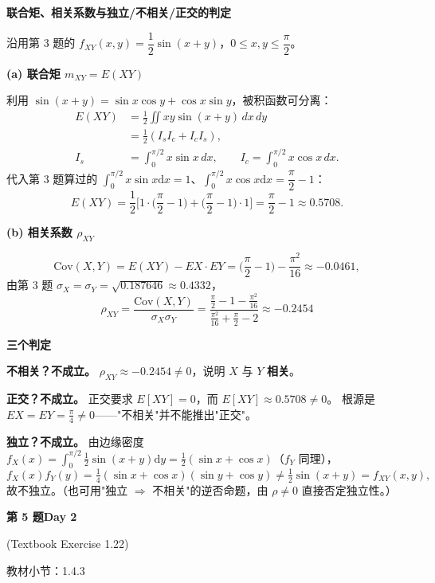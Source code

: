 \documentclass[10.5pt,fontset=fandol]{ctexart}
\newcommand{\key}[1]{\par\vspace{4pt}\noindent\textbf{\color{navy}#1}\par\vspace{2pt}}
\newcommand{\dd}{\mathrm d}\newcommand{\Var}{\operatorname{Var}}\newcommand{\Cov}{\operatorname{Cov}}
\newcommand{\qtitle}[2]{\par\addvspace{1.2em}\Needspace{8\baselineskip}\begin{tcolorbox}[colback=navy,colframe=navy,arc=1.5pt,boxrule=0pt]\color{white}\large\bfseries #1\hfill\small #2\end{tcolorbox}}
\begin{document}
\noindent\textbf{联合矩、相关系数与独立/不相关/正交的判定}\par\smallskip\begin{tcolorbox}[breakable,colback=qbg,colframe=qbg,boxrule=0pt]沿用第 3 题的 $f_{XY}(x,y)=\dfrac12\sin(x+y)$，$0\le x,y\le\dfrac{\pi}{2}$。

\key{(a) 联合矩 $m_{XY}=E(XY)$}
利用 $\sin(x+y)=\sin x\cos y+\cos x\sin y$，被积函数可分离：
\[\begin{aligned}
E(XY)&=\frac12\iint xy\sin(x+y)\,dx\,dy\\
&=\frac12(I_sI_c+I_cI_s),\\
I_s&=\int_0^{\pi/2}x\sin x\,dx,\qquad
I_c=\int_0^{\pi/2}x\cos x\,dx.
\end{aligned}\]
代入第 3 题算过的 $\int_0^{\pi/2}x\sin x\dd x=1$、$\int_0^{\pi/2}x\cos x\dd x=\dfrac{\pi}{2}-1$：
\[
E(XY)=\frac12\Big[1\cdot\Big(\frac{\pi}{2}-1\Big)+\Big(\frac{\pi}{2}-1\Big)\cdot1\Big]
=\frac{\pi}{2}-1\approx0.5708 .
\]

\key{(b) 相关系数 $\rho_{XY}$}
\[
\mathrm{Cov}(X,Y)=E(XY)-EX\cdot EY=\Big(\frac{\pi}{2}-1\Big)-\frac{\pi^2}{16}\approx-0.0461,
\]
由第 3 题 $\sigma_X=\sigma_Y=\sqrt{0.187646}\approx0.4332$，
\[
\boxed{\rho_{XY}=\frac{\mathrm{Cov}(X,Y)}{\sigma_X\sigma_Y}
=\frac{\frac{\pi}{2}-1-\frac{\pi^2}{16}}{\frac{\pi^2}{16}+\frac{\pi}{2}-2}\approx-0.2454}
\]

\key{三个判定}
\begin{bul}
  \item \textbf{不相关？不成立。} $\rho_{XY}\approx-0.2454\neq0$，说明 $X$ 与 $Y$ \textbf{相关}。
  \item \textbf{正交？不成立。} 正交要求 $E[XY]=0$，而 $E[XY]\approx0.5708\neq0$。
        根源是 $EX=EY=\tfrac{\pi}{4}\neq0$——"不相关"并不能推出"正交"。
  \item \textbf{独立？不成立。} 由边缘密度
        $f_X(x)=\int_0^{\pi/2}\tfrac12\sin(x+y)\dd y=\tfrac12(\sin x+\cos x)$（$f_Y$ 同理），
        \[
        f_X(x)f_Y(y)=\tfrac14(\sin x+\cos x)(\sin y+\cos y)\neq\tfrac12\sin(x+y)=f_{XY}(x,y),
        \]
        故不独立。（也可用"独立 $\Rightarrow$ 不相关"的逆否命题，由 $\rho\neq0$ 直接否定独立性。）
\end{bul}
\end{tcolorbox}
\qtitle{第 5 题}{Day 2}
{\small\color{accentred}(Textbook Exercise 1.22)}\par\smallskip
{\small\color{muted}教材小节：1.4.3}\par\medskip
\end{document}
